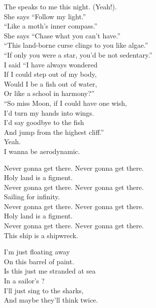 
The  speaks to me this night. (Yeah!). \\
She says ``Follow my light.'' \\
``Like a moth's inner compass.'' \\
She says ``Chase what you can't have.'' \\
``This land-borne curse clings to you like algae.'' \\
``If only you were a star, you'd be not sedentary.'' \\

I said ``I have always wondered \\
If I could step out of my body, \\
Would I be a fish out of water, \\
Or like a school in harmony?'' \\
``So miss Moon, if I could have one wish, \\
I'd turn my hands into wings. \\
I'd say goodbye to the fish \\
And jump from the highest cliff.'' \\
Yeah. \\

I wanna be aerodynamic. \\


Never gonna get there. Never gonna get there. \\
Holy land is a figment. \\
Never gonna get there. Never gonna get there. \\
Sailing for infinity. \\
Never gonna get there. Never gonna get there. \\
Holy land is a figment. \\
Never gonna get there. Never gonna get there. \\
This ship is a shipwreck. \\


I'm just floating away \\
On this barrel of paint. \\
Is this just me stranded at sea \\
In a sailor's ? \\
I'll just sing to the sharks, \\
And maybe they'll think twice. \\


